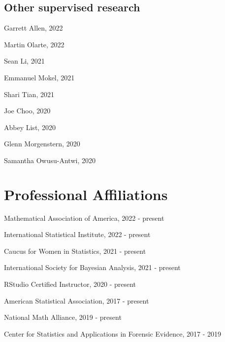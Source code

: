 \documentclass[11pt,dvipsnames]{article}
\renewenvironment{itemize}{
  \begin{list}{}{
    \setlength{\leftmargin}{1.5em}
  }
}{
  \end{list}
}
\begin{document}
\hypertarget{other-supervised-research}{%
\subsection{Other supervised research}\label{other-supervised-research}}

\begin{multicols}{2}
\begin{itemize}
\item Garrett Allen, 2022
\item Martin Olarte, 2022
\item Sean Li, 2021
\item Emmanuel Mokel, 2021
\item Shari Tian, 2021
\item Joe Choo, 2020
\item Abbey List, 2020
\item Glenn Morgenstern, 2020
\item Samantha Owusu-Antwi, 2020
\end{itemize}
\end{multicols}

\hypertarget{professional-affiliations}{%
\section{Professional Affiliations}\label{professional-affiliations}}

Mathematical Association of America, 2022 - present

International Statistical Institute, 2022 - present

Caucus for Women in Statistics, 2021 - present

International Society for Bayesian Analysis, 2021 - present

RStudio Certified Instructor, 2020 - present

American Statistical Association, 2017 - present

National Math Alliance, 2019 - present

Center for Statistics and Applications in Forensic Evidence, 2017 - 2019
\end{document}
